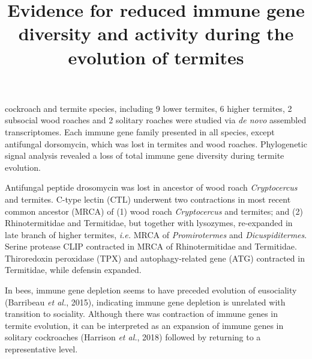 \documentclass[11pt]{article}
\title{Evidence for reduced immune gene diversity and activity during the evolution of termites}
\author{}
\date{}
\begin{document}
\begin{sloppypar}
  \maketitle

   cockroach and termite species, including 9 lower termites, 6 higher termites, 2 subsocial wood roaches and 2 solitary roaches were studied via \textit{de novo} assembled transcriptomes. 
Each immune gene family presented in all species, except antifungal dorsomycin, which was lost in termites and wood roaches. 
Phylogenetic signal analysis revealed a loss of total immune gene diversity during termite evolution. 


\par

Antifungal peptide drosomycin was lost in ancestor of wood roach \textit{Cryptocercus} and termites. 
C-type lectin (CTL) underwent two contractions in most recent common ancestor (MRCA) of (1) wood roach \textit{Cryptocercus} and termites; and (2) Rhinotermitidae and Termitidae, but together with lysozymes, re-expanded in late branch of higher termites, \textit{i.e.} MRCA of \textit{Promirotermes} and \textit{Dicuspiditermes}. 
Serine protease CLIP contracted in MRCA of Rhinotermitidae and Termitidae. 
Thiroredoxin peroxidase (TPX) and autophagy-related gene (ATG) contracted in Termitidae, while defensin expanded. 

\par

In bees, immune gene depletion seems to have preceded evolution of eusociality (Barribeau \textit{et al.}, 2015), indicating immune gene depletion is unrelated with transition to sociality. 
Although there was contraction of immune genes in termite evolution, it can be interpreted as an expansion of immune genes in solitary cockroaches (Harrison \textit{et al.}, 2018) followed by returning to a representative level.

\end{sloppypar}
\end{document}
